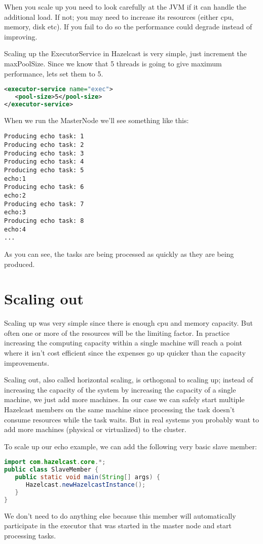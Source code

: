 When you scale up you need to look carefully at the JVM if it can handle the additional load. If not; you may need to increase its resources (either cpu, memory, disk etc). If you fail to do so the performance could degrade instead of improving. 

Scaling up the ExecutorService in Hazelcast is very simple, just increment the maxPoolSize. Since we know that 5 threads is going to give maximum performance, lets set them to 5.
\begin{lstlisting}[language=xml]
<executor-service name="exec">
   <pool-size>5</pool-size>
</executor-service>
\end{lstlisting}
When we run the MasterNode we'll see something like this:
\begin{lstlisting}
Producing echo task: 1
Producing echo task: 2
Producing echo task: 3
Producing echo task: 4
Producing echo task: 5
echo:1
Producing echo task: 6
echo:2
Producing echo task: 7
echo:3
Producing echo task: 8
echo:4
...
\end{lstlisting}
As you can see, the tasks are being processed as quickly as they are being produced. 

\section{Scaling out}
Scaling up was very simple since there is enough cpu and memory capacity. But often one or more of the resources will be the limiting factor. In practice increasing the computing capacity within a single machine will reach a point where it isn't cost efficient since the expenses go up quicker than the capacity improvements.

Scaling out, also called horizontal scaling, is orthogonal to scaling up; instead of increasing the capacity of the system by increasing the capacity of a single machine, we just add more machines. In our case we can safely start multiple Hazelcast members on the same machine since processing the task doesn't consume resources while the task waits. But in real systems you probably want to add more machines (physical or virtualized) to the cluster.

To scale up our echo example, we can add the following very basic slave member:
\begin{lstlisting}[language=java]
import com.hazelcast.core.*;
public class SlaveMember {
   public static void main(String[] args) {
      Hazelcast.newHazelcastInstance();
   }
}
\end{lstlisting}
We don't need to do anything else because this member will automatically participate in the executor that was started in the master node and start processing tasks. 

